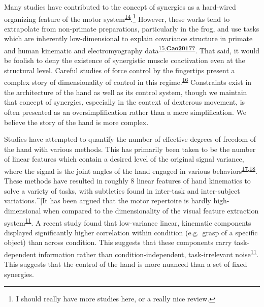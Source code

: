 \documentclass[
  a4paper,
]{article}
\begin{document}
Many studies have contributed to the concept of synergies as a
hard-wired organizing feature of the motor
system\textsuperscript{\protect\hyperlink{ref-DAvella2003}{14}}.\footnote{I
  should really have more studies here, or a really nice review.}
However, these works tend to extrapolate from non-primate preparations,
particularly in the frog, and use tasks which are inherently
low-dimensional to explain covariance structure in primate and human
kinematic and electromyography
data\textsuperscript{\protect\hyperlink{ref-giszterMotorPrimitivesNew2015}{15},\protect\hyperlink{ref-Gao2017}{\textbf{Gao2017?}}}.
That said, it would be foolish to deny the existence of synergistic
muscle coactivation even at the structural level. Careful studies of
force control by the fingertips present a complex story of
dimensionality of control in this
regime.\textsuperscript{\protect\hyperlink{ref-raczSpatiotemporalAnalysisReveals2013}{16}}
Constraints exist in the architecture of the hand as well as its control
system, though we maintain that concept of synergies, especially in the
context of dexterous movement, is often presented as an
oversimplification rather than a mere simplification. We believe the
story of the hand is more complex.

Studies have attempted to quantify the number of effective degrees of
freedom of the hand with various methods. This has primarily been taken
to be the number of linear features which contain a desired level of the
original signal variance, where the signal is the joint angles of the
hand engaged in various
behaviors\textsuperscript{\protect\hyperlink{ref-Ingram2009}{17},\protect\hyperlink{ref-TodorovDimensionality2005}{18}}.
These methods have resulted in roughly 8 linear features of hand
kinematics to solve a variety of tasks, with subtleties found in
inter-task and inter-subject variations.\^{}{[}It has been argued that
the motor repertoire is hardly high-dimensional when compared to the
dimensionality of the visual feature extraction
system\textsuperscript{\protect\hyperlink{ref-yanUnexpectedComplexityEveryday2020}{11}}.
A recent study found that low-variance linear, kinematic components
displayed significantly higher correlation within condition (e.g.~grasp
of a specific object) than across condition. This suggests that these
components carry task-dependent information rather than
condition-independent, task-irrelevant
noise\textsuperscript{\protect\hyperlink{ref-yanUnexpectedComplexityEveryday2020}{11}}.
This suggests that the control of the hand is more nuanced than a set of
fixed synergies.
\end{document}
